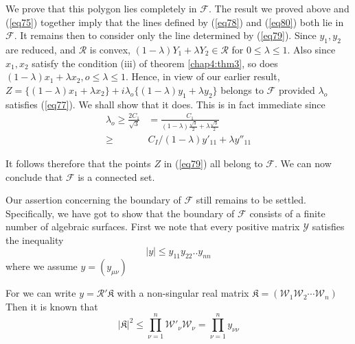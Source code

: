  We prove that this polygon lies completely in $\mathcal{F}$. The
 result we proved above and (\ref{eq75}) together imply that the lines
 defined by (\ref{eq78}) and (\ref{eq80}) both lie in $\mathcal{F}$. It remains
 then to consider only the line determined by (\ref{eq79}). Since $y_1, y_2$
 are reduced, and $\mathscr{R}$ is convex, $(1-\lambda )Y_1 + \lambda
 Y_2 \in \mathscr{R}$ for $0 \leq \lambda \leq 1$. Also since $x_1,
 x_2$ satisfy the condition (iii) of theorem \ref{chap4:thm3}, so does
 $(1-\lambda ) x_1 + \lambda x_2, o \leq \lambda \leq 1 $. Hence, in
 view of our earlier result, $Z = \{ (1-\lambda ) x_1 + \lambda x_2 \}
 + i \lambda_o \{(1-\lambda) y_1 +\lambda y_2 \}$ belongs to
 $\mathcal{F}$ provided $\lambda_o$ satisfies (\ref{eq77}). We shall show
 that it does. This is in fact immediate since 
\begin{align*}
\lambda_o \geq \frac{2C_1}{\sqrt{3}} &= \frac{C_1}{(1-\lambda
  )\frac{\sqrt{3}}{2} + \lambda \frac{\sqrt{3}}{2}}\\ 
\geq & C_I / (1- \lambda )y'_{11} + \lambda y''_{11}
\end{align*}

It follows therefore that the points $Z$ in (\ref{eq79}) all belong to
$\mathcal{F}$. We can now conclude that $\mathcal{F}$ is a connected
set.  

Our assertion concerning the boundary of $\mathcal{F}$ still remains
to be settled. Specifically, we have got to show that the boundary of
$\mathcal{F}$ consists of a finite number of algebraic surfaces. First
we note that every positive matrix $\mathcal{Y}$ satisfies the
inequality 
\begin{equation*}
| y | \leq  y_{11} y_{22} . . y_{nn} \tag{81}\label{eq81}   
\end{equation*}\pageoriginale
where we assume $y = (y_{\mu \nu})$

For we can write $y = \mathcal{R'}\mathfrak{K}$ with a non-singular
real matrix $\mathfrak{K} = ( \mathscr{W}_1 \mathscr{W}_2 \cdots
\mathscr{W}_n)$ Then it is known that  
$$
| \mathfrak{K}|^2 \leq \prod^n_{\nu =1}\mathscr{W}'_\nu \mathscr{W}_\nu
= \prod^n_{\nu =1} y_{\nu \nu} 
$$

